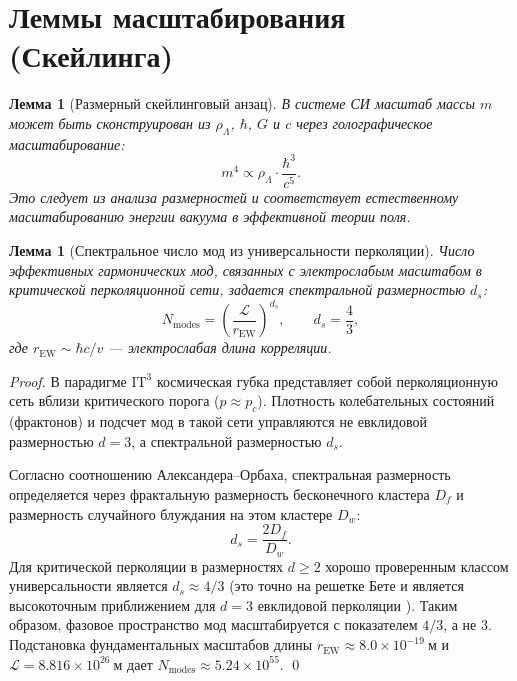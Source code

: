 \documentclass[11pt,a4paper]{article}
\newtheorem{lemma}[theorem]{Лемма}
\newcommand{\ITthree}{\ensuremath{\mathrm{IT}^3}}
\newcommand{\Ltop}{\ensuremath{\mathcal{L}}}
\newcommand{\rhoLambda}{\ensuremath{\rho_\Lambda}}
\newcommand{\Nmodes}{\ensuremath{N_{\mathrm{modes}}}}
\begin{document}
\section{Леммы масштабирования (Скейлинга)}
\label{sec:lemmas}

\begin{lemma}[Размерный скейлинговый анзац]
\label{lem:dimensions}
В системе СИ масштаб массы $m$ может быть сконструирован из $\rhoLambda$, $\hbar$, $G$ и $c$ через голографическое масштабирование:
\begin{equation}
m^4 \propto \rhoLambda \cdot \frac{\hbar^3}{c^5}.
\label{eq:dim}
\end{equation}
Это следует из анализа размерностей и соответствует естественному масштабированию энергии вакуума в эффективной теории поля.
\end{lemma}

\begin{lemma}[Спектральное число мод из универсальности перколяции]
\label{lem:modes}
Число эффективных гармонических мод, связанных с электрослабым масштабом в критической перколяционной сети, задается спектральной размерностью $d_s$:
\begin{equation}
\Nmodes = \left(\frac{\Ltop}{r_{\mathrm{EW}}}\right)^{d_s}, \qquad d_s = \frac{4}{3},
\label{eq:Nmodes}
\end{equation}
где $r_{\mathrm{EW}} \sim \hbar c / v$ --- электрослабая длина корреляции.
\end{lemma}

\begin{proof}
В парадигме $\ITthree$ космическая губка представляет собой перколяционную сеть вблизи критического порога ($p \approx p_c$). Плотность колебательных состояний (фрактонов) и подсчет мод в такой сети управляются не евклидовой размерностью $d=3$, а спектральной размерностью $d_s$.

Согласно соотношению Александера--Орбаха, спектральная размерность определяется через фрактальную размерность бесконечного кластера $D_f$ и размерность случайного блуждания на этом кластере $D_w$:
\[
d_s = \frac{2 D_f}{D_w}.
\]
Для критической перколяции в размерностях $d \ge 2$ хорошо проверенным классом универсальности является $d_s \approx 4/3$ (это точно на решетке Бете и является высокоточным приближением для $d=3$ евклидовой перколяции \citep{Alexander1982, Stauffer1994}). Таким образом, фазовое пространство мод масштабируется с показателем $4/3$, а не $3$. Подстановка фундаментальных масштабов длины $r_{\mathrm{EW}} \approx 8.0 \times 10^{-19}~\mathrm{м}$ и $\Ltop = 8.816 \times 10^{26}~\mathrm{м}$ дает $\Nmodes \approx 5.24 \times 10^{55}$. \qed
\end{proof}
\end{document}
